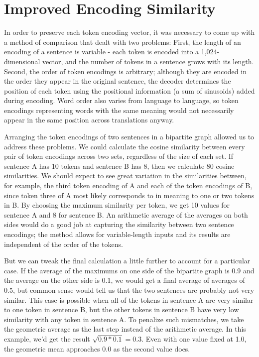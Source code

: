 \section{Improved Encoding Similarity}

In order to preserve each token encoding vector, it was necessary to come up with a method of comparison that dealt with two problems: First, the length of an encoding of a sentence is variable - each token is encoded into a 1,024-dimensional vector, and the number of tokens in a sentence grows with its length. Second, the order of token encodings is arbitrary; although they are encoded in the order they appear in the original sentence, the decoder determines the position of each token using the positional information (a sum of sinusoids) added during encoding. Word order also varies from language to language, so token encodings representing words with the same meaning would not necessarily appear in the same position across translations anyway. 

Arranging the token encodings of two sentences in a bipartite graph allowed us to address these problems. We could calculate the cosine similarity between every pair of token encodings across two sets, regardless of the size of each set. If sentence A has 10 tokens and sentence B has 8, then we calculate 80 cosine similarities. We should expect to see great variation in the similarities between, for example, the third token encoding of A and each of the token encodings of B, since token three of A most likely corresponds to in meaning to one or two tokens in B. By choosing the maximum similarity per token, we get 10 values for sentence A and 8 for sentence B. An arithmetic average of the averages on both sides would do a good job at capturing the similarity between two sentence encodings; the method allows for variable-length inputs and its results are independent of the order of the tokens. 

But we can tweak the final calculation a little further to account for a particular case. If the average of the maximums on one side of the bipartite graph is 0.9 and the average on the other side is 0.1, we would get a final average of averages of 0.5, but common sense would tell us that the two sentences are probably not very similar. This case is possible when all of the tokens in sentence A are very similar to one token in sentence B, but the other tokens in sentence B have very low similarity with any token in sentence A. To penalize such mismatches, we take the geometric average as the last step instead of the arithmetic average. In this example, we'd get the result $\sqrt{0.9*0.1}=0.3$. Even with one value fixed at 1.0, the geometric mean approaches 0.0 as the second value does.  

